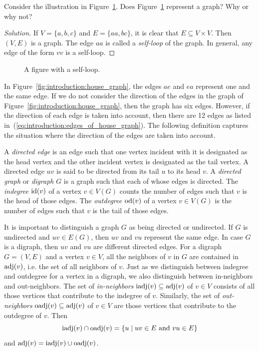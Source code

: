 \begin{example}
Consider the illustration in
Figure~\ref{fig:introduction:self_loop}. Does
Figure~\ref{fig:introduction:self_loop} represent a graph? Why or why not?
\end{example}

\begin{proof}[Solution]
If $V = \{ a, b, c \}$ and $E = \{ aa, bc \}$, it is clear that $E
\subseteq V \times V$. Then $(V, E)$ is a graph. The edge $aa$ is
called a \emph{self-loop} of the graph. In general, any edge of the
form $vv$ is a self-loop.
\end{proof}

\begin{figure}[!htbp]
\centering

\caption{A figure with a self-loop.}
\label{fig:introduction:self_loop}
\end{figure}

In Figure~\ref{fig:introduction:house_graph}, the edges $ae$ and $ea$
represent one and the same edge. If we do not consider the direction
of the edges in the graph of
Figure~\ref{fig:introduction:house_graph}, then the graph has six
edges. However, if the direction of each edge is taken into account,
then there are 12 edges as listed
in~(\ref{eq:introduction:edges_of_house_graph}). The following
definition captures the situation where the direction of the edges are
taken into account.

A \emph{directed edge} is an edge such that one vertex incident with it
is designated as the head vertex and the other incident vertex is
designated as the tail vertex. A directed edge $uv$ is said to be
directed from its tail $u$ to its head $v$. A \emph{directed graph} or
\emph{digraph} $G$ is a graph such that each of whose edges is
directed. The \emph{indegree} $\operatorname*{id}(v)$ of a vertex $v \in V(G)$ counts
the number of edges such that $v$ is the head of those edges. The
\emph{outdegree} $\operatorname*{od}(v)$ of a vertex $v \in V(G)$ is the number of
edges such that $v$ is the tail of those edges.
\index{$\id$}
\index{$\od$}

It is important to distinguish a graph $G$ as being directed or
undirected. If $G$ is undirected and $uv \in E(G)$, then $uv$ and $vu$
represent the same edge. In case $G$ is a digraph, then $uv$ and $vu$
are different directed edges. For a digraph $G = (V, E)$ and a vertex
$v \in V$, all the neighbors of $v$ in $G$ are contained in $\operatorname*{adj}(v)$,
i.e. the set of all neighbors of $v$. Just as we distinguish between
indegree and outdegree for a vertex in a digraph, we also distinguish
between in-neighbors and out-neighbors. The set of \emph{in-neighbors}
$\operatorname*{iadj}(v) \subseteq \operatorname*{adj}(v)$ of $v \in V$ consists of all those
vertices that contribute to the indegree of $v$. Similarly, the set
of \emph{out-neighbors} $\operatorname*{oadj}(v) \subseteq \operatorname*{adj}(v)$ of $v \in V$ are
those vertices that contribute to the outdegree of $v$. Then
\[
\operatorname*{iadj}(v) \cap \operatorname*{oadj}(v)
=
\{u \;|\; uv \in E \text{ and } vu \in E\}
\]
and $\operatorname*{adj}(v) = \operatorname*{iadj}(v) \cup \operatorname*{oadj}(v)$.
\index{$\iadj$}
\index{$\oadj$}

